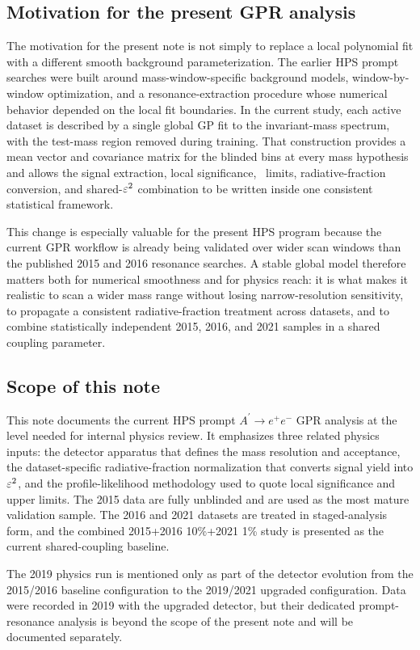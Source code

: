 \subsection{Motivation for the present GPR analysis}

The motivation for the present note is not simply to replace a local polynomial fit
with a different smooth background parameterization. The earlier HPS prompt searches
were built around mass-window-specific background models, window-by-window optimization,
and a resonance-extraction procedure whose numerical behavior depended on the local fit
boundaries. In the current study, each active dataset is described by a single global
GP fit to the invariant-mass spectrum, with the test-mass region removed during
training. That construction provides a mean vector and covariance matrix for the
blinded bins at every mass hypothesis and allows the signal extraction, local
significance, \CLs\ limits, radiative-fraction conversion, and shared-$\varepsilon^2$
combination to be written inside one consistent statistical framework.

This change is especially valuable for the present HPS program because the current GPR
workflow is already being validated over wider scan windows than the published 2015 and
2016 resonance searches. A stable global model therefore matters both for numerical
smoothness and for physics reach: it is what makes it realistic to scan a wider mass
range without losing narrow-resolution sensitivity, to propagate a consistent
radiative-fraction treatment across datasets, and to combine statistically independent
2015, 2016, and 2021 samples in a shared coupling parameter.

\subsection{Scope of this note}

This note documents the current HPS prompt $A^\prime \rightarrow e^+e^-$ GPR analysis
at the level needed for internal physics review. It emphasizes three related physics
inputs: the detector apparatus that defines the mass resolution and acceptance, the
dataset-specific radiative-fraction normalization that converts signal yield into
$\varepsilon^2$, and the profile-likelihood methodology used to quote local significance and
upper limits. The 2015 data are fully unblinded and are used as the most mature
validation sample. The 2016 and 2021 datasets are treated in staged-analysis form, and
the combined 2015+2016 10\%+2021 1\% study is presented as the current shared-coupling
baseline.

The 2019 physics run is mentioned only as part of the detector evolution from the
2015/2016 baseline configuration to the 2019/2021 upgraded configuration. Data were
recorded in 2019 with the upgraded detector, but their dedicated prompt-resonance
analysis is beyond the scope of the present note and will be documented separately.
